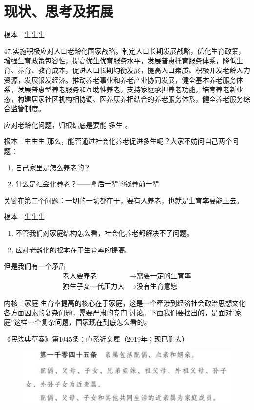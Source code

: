 \documentclass[presentation]{beamer}
\begin{document}
\section{现状、思考及拓展}
\label{sec:org81cc497}
\begin{frame}[label={sec:org46dd89e}]{根本：生生生}
\begin{quoting}
{\footnotesize 47.实施积极应对人口老龄化国家战略。制定人口长期发展战略，优化生育政策，增强生育政策包容性，提高优生优育服务水平，发展普惠托育服务体系，降低生育、养育、教育成本，促进人口长期均衡发展，提高人口素质。积极开发老龄人力资源，发展银发经济。推动养老事业和养老产业协同发展，健全基本养老服务体系，发展普惠型养老服务和互助性养老，支持家庭承担养老功能，培育养老新业态，构建居家社区机构相协调、医养康养相结合的养老服务体系，健全养老服务综合监管制度。}
\end{quoting}

应对老龄化问题，归根结底是要能 \alert{多生} 。
\end{frame}
\begin{frame}[label={sec:orgca3ed6d}]{根本：生生生}
那么，能否通过社会化养老促进多生呢？大家不妨问自己两个问题：
\begin{enumerate}
\item 自己家里是怎么养老的？
\item 什么是社会化养老？——拿后一辈的钱养前一辈\pause
\end{enumerate}


关键在第二个问题：一切的一切都在于，要有人养老，也就是生育率要能上去。
\end{frame}
\begin{frame}[label={sec:orgdce945b}]{根本：生生生}
\begin{enumerate}
\item 不管我们对家庭结构怎么看，社会化养老都解决不了问题。
\item 应对老龄化的根本在于生育率的提高。\pause
\end{enumerate}


但是我们有一个矛盾
\begin{align*}
\text{老人要养老}&\longrightarrow\text{需要一定的生育率}\\
\text{独生子女一代压力大}&\longrightarrow\text{没有生育意愿}
\end{align*}
\end{frame}
\begin{frame}[label={sec:orgdab71b3}]{内核：家庭}
生育率提高的核心在于家庭，这是一个牵涉到经济社会政治思想文化各方面因素的复杂问题，需要严肃的专门
讨论。下面我们要摆出的，是面对“家庭”这样一个复杂问题，国家现在到底怎么看的。\pause

《民法典草案》第1045条：直系近亲属（2019年；现已删去）
\begin{figure}[htbp]
\centering
\includegraphics[width=.7\textwidth]{./10.png}
\label{}
\end{figure}
\end{frame}
\end{document}

